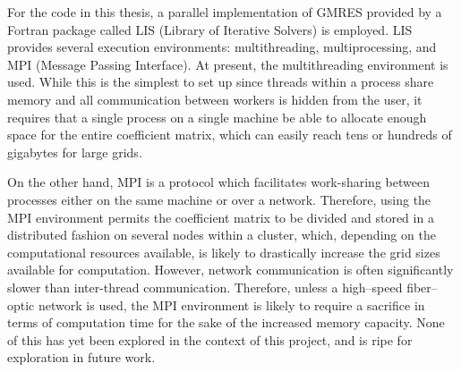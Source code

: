 For the code in this thesis, a parallel implementation of GMRES provided by a Fortran package called LIS (Library of Iterative Solvers) is employed.
LIS provides several execution environments: multithreading, multiprocessing, and MPI (Message Passing Interface).
At present, the multithreading environment is used.
While this is the simplest to set up since threads within a process share memory and all communication between workers is hidden from the user, it requires that a single process on a single machine be able to allocate enough space for the entire coefficient matrix, which can easily reach tens or hundreds of gigabytes for large grids.

On the other hand, MPI is a protocol which facilitates work-sharing between processes either on the same machine or over a network.
Therefore, using the MPI environment permits the coefficient matrix to be divided and stored in a distributed fashion on several nodes within a cluster, which, depending on the computational resources available, is likely to drastically increase the grid sizes available for computation.
However, network communication is often significantly slower than inter-thread communication.
Therefore, unless a high--speed fiber--optic network is used, the MPI environment is likely to require a sacrifice in terms of computation time for the sake of the increased memory capacity.
None of this has yet been explored in the context of this project, and is ripe for exploration in future work.

